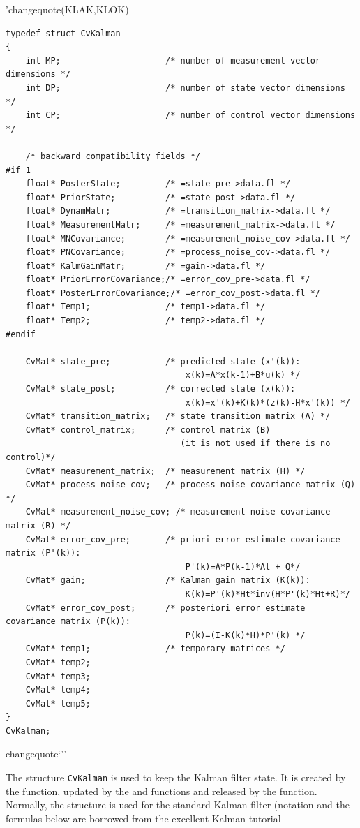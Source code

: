 'changequote(KLAK,KLOK)
\begin{lstlisting}
typedef struct CvKalman
{
    int MP;                     /* number of measurement vector dimensions */
    int DP;                     /* number of state vector dimensions */
    int CP;                     /* number of control vector dimensions */

    /* backward compatibility fields */
#if 1
    float* PosterState;         /* =state_pre->data.fl */
    float* PriorState;          /* =state_post->data.fl */
    float* DynamMatr;           /* =transition_matrix->data.fl */
    float* MeasurementMatr;     /* =measurement_matrix->data.fl */
    float* MNCovariance;        /* =measurement_noise_cov->data.fl */
    float* PNCovariance;        /* =process_noise_cov->data.fl */
    float* KalmGainMatr;        /* =gain->data.fl */
    float* PriorErrorCovariance;/* =error_cov_pre->data.fl */
    float* PosterErrorCovariance;/* =error_cov_post->data.fl */
    float* Temp1;               /* temp1->data.fl */
    float* Temp2;               /* temp2->data.fl */
#endif

    CvMat* state_pre;           /* predicted state (x'(k)):
                                    x(k)=A*x(k-1)+B*u(k) */
    CvMat* state_post;          /* corrected state (x(k)):
                                    x(k)=x'(k)+K(k)*(z(k)-H*x'(k)) */
    CvMat* transition_matrix;   /* state transition matrix (A) */
    CvMat* control_matrix;      /* control matrix (B)
                                   (it is not used if there is no control)*/
    CvMat* measurement_matrix;  /* measurement matrix (H) */
    CvMat* process_noise_cov;   /* process noise covariance matrix (Q) */
    CvMat* measurement_noise_cov; /* measurement noise covariance matrix (R) */
    CvMat* error_cov_pre;       /* priori error estimate covariance matrix (P'(k)):
                                    P'(k)=A*P(k-1)*At + Q*/
    CvMat* gain;                /* Kalman gain matrix (K(k)):
                                    K(k)=P'(k)*Ht*inv(H*P'(k)*Ht+R)*/
    CvMat* error_cov_post;      /* posteriori error estimate covariance matrix (P(k)):
                                    P(k)=(I-K(k)*H)*P'(k) */
    CvMat* temp1;               /* temporary matrices */
    CvMat* temp2;
    CvMat* temp3;
    CvMat* temp4;
    CvMat* temp5;
}
CvKalman;
\end{lstlisting}
changequote`''

The structure \texttt{CvKalman} is used to keep the Kalman filter
state. It is created by the  function, updated
by the  and  functions
and released by the  function. Normally, the
structure is used for the standard Kalman filter (notation and the
formulas below are borrowed from the excellent Kalman tutorial

